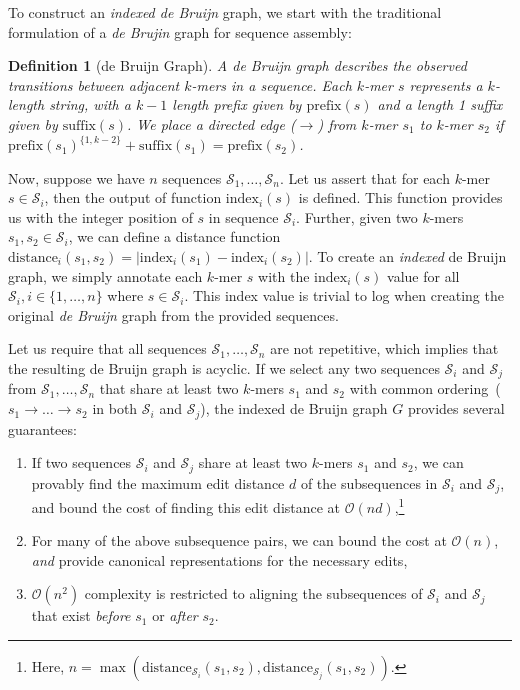 \documentclass[11pt]{article}
\newtheorem{defn}{Definition}
\begin{document}
To construct an \emph{indexed de Bruijn} graph, we start with the traditional formulation of a \emph{de
Brujin} graph for sequence assembly:

\begin{defn}[de Bruijn Graph]
\label{defn:dbg}
A de Bruijn graph describes the observed transitions between adjacent $k$-mers in a sequence. Each
$k$-mer $s$ represents a $k$-length string, with a $k - 1$ length prefix given by $\text{prefix}(s)$ and a
length 1 suffix given by $\text{suffix}(s)$. We place a directed edge ($\rightarrow$) from $k$-mer $s_1$ to
$k$-mer $s_2$ if $\text{prefix}(s_1)^{\{1, k - 2\}} + \text{suffix}(s_1) = \text{prefix}(s_2)$.
\end{defn}

Now, suppose we have $n$ sequences $\mathcal{S}_1, \dots, \mathcal{S}_n$. Let us assert that for each
$k$-mer $s \in \mathcal{S}_i$, then the output of function $\text{index}_i(s)$ is defined. This function
provides us with the integer position of $s$ in sequence $\mathcal{S}_i$. Further, given two $k$-mers
$s_1, s_2 \in \mathcal{S}_i$, we can define a distance function
$\text{distance}_i(s_1, s_2) = | \text{index}_i(s_1) - \text{index}_i(s_2) |$. To create an \emph{indexed}
de Bruijn graph, we simply annotate each $k$-mer $s$ with the $\text{index}_i(s)$ value for all
$\mathcal{S}_i, i \in \{1, \dots, n\}$ where $s \in \mathcal{S}_i$. This index value is trivial to log when
creating the original \emph{de Bruijn} graph from the provided sequences.

Let us require that all sequences $\mathcal{S}_1, \dots, \mathcal{S}_n$ are not repetitive, which implies
that the resulting de Bruijn graph is acyclic. If we select any two sequences $\mathcal{S}_i$ and
$\mathcal{S}_j$ from $\mathcal{S}_1, \dots, \mathcal{S}_n$ that share at least two $k$-mers $s_1$ and
$s_2$ with common ordering~($s_1 \rightarrow \dots \rightarrow s_2$ in both $\mathcal{S}_i$ and
$\mathcal{S}_j$), the indexed de Bruijn graph $G$ provides several guarantees:

\begin{enumerate}
\item If two sequences $\mathcal{S}_i$ and $\mathcal{S}_j$ share at least two $k$-mers $s_1$ and
$s_2$, we can provably find the maximum edit distance $d$ of the subsequences in $\mathcal{S}_i$ and
$\mathcal{S}_j$, and bound the cost of finding this edit distance at $\mathcal{O}(nd)$,\footnote{Here,
$n = \max(\text{distance}_{\mathcal{S}_i}(s_1, s_2), \text{distance}_{\mathcal{S}_j}(s_1, s_2))$.}
\item For many of the above subsequence pairs, we can bound the cost at $\mathcal{O}(n)$, \emph{and}
provide canonical representations for the necessary edits,
\item $\mathcal{O}(n^2)$ complexity is restricted to aligning the subsequences of $\mathcal{S}_i$ and
$\mathcal{S}_j$ that exist \emph{before} $s_1$ or \emph{after} $s_2$.
\end{enumerate}
\end{document}
